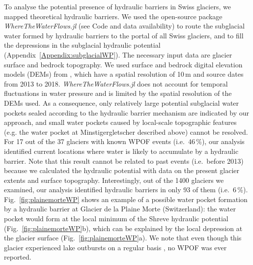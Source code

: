 To analyse the potential presence of hydraulic barriers in Swiss glaciers, we mapped theoretical hydraulic barriers. We used the open-source package \textit{WhereTheWaterFlows.jl} (see Code and data availability) to route the subglacial water formed by hydraulic barriers to the portal of all Swiss glaciers, and to fill the depressions in the subglacial hydraulic potential (Appendix~\ref{Appendix:subglacialWP}). The necessary input data are glacier surface and bedrock topography. We used surface and bedrock digital elevation models (DEMs) from \citet{Grab&al2021}, which have a spatial resolution of 10\,m and source dates from 2013 to 2018. \textit{WhereTheWaterFlows.jl} does not account for temporal fluctuations in water pressure and is limited by the spatial resolution of the DEMs used. As a consequence, only relatively large potential subglacial water pockets sealed according to the hydraulic barrier mechanism are indicated by our approach, and small water pockets caused by local-scale topographic features (e.g. the water pocket at Minstigergletscher described above) cannot be resolved. For 17 out of the 37 glaciers with known WPOF events (i.e.\ 46\,\%), our analysis identified current locations where water is likely to accumulate by a hydraulic barrier. Note that this result cannot be related to past events (i.e.\ before 2013) because we calculated the hydraulic potential with data on the present glacier extents and surface topography. Interestingly, out of the 1400 glaciers we examined, our analysis identified hydraulic barriers in only 93 of them (i.e.\ 6\,\%).  Fig.~\ref{fig:plainemorteWP} shows an example of a possible water pocket formation by a hydraulic barrier at Glacier de la Plaine Morte (Switzerland): the water pocket would form at the local minimum of the Shreve hydraulic potential (Fig.~\ref{fig:plainemorteWP}b), which can be explained by the local depression at the glacier surface (Fig.~\ref{fig:plainemorteWP}a). We note that even though this glacier experienced lake outbursts on a regular basis \citep{Lindner&al2020,Ogier&al2021}, no WPOF was ever reported.


